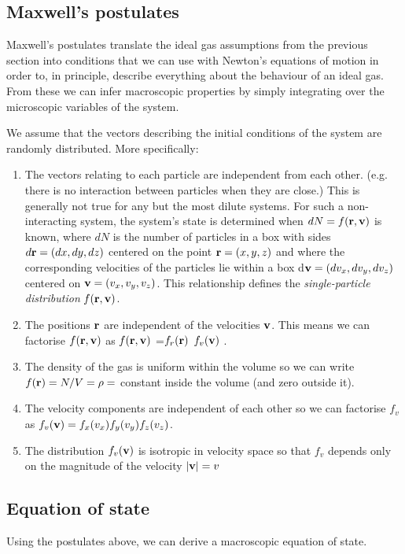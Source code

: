 \subsection{Maxwell's postulates}
Maxwell's postulates translate the ideal gas assumptions from the previous section into conditions that we can use with Newton's equations of motion in order to, in principle, describe everything about the behaviour of an ideal gas. From these we can infer macroscopic properties by simply integrating over the microscopic variables of the system.

We assume that the vectors describing the initial conditions of the system are randomly distributed. More specifically:
\begin{enumerate}
\item The vectors relating to each particle are independent from each other. (e.g. there is no interaction between particles when they are close.) This is generally not true for any but the most dilute systems. For such a non-interacting system, the system's state is determined when $dN=f({\bf r},{\bf v})$ is known, where $dN$ is the number of particles in a box with sides $d{\bf r}=(dx,dy,dz)$ centered on the point ${\bf r} = (x,y,z)$ and where the corresponding velocities of the particles lie within a box d${\bf v}=(dv_x,dv_y,dv_z)$ centered on ${\bf v}=(v_x,v_y,v_z)$. This relationship defines the \emph{single-particle distribution} $f({\bf r},{\bf v})$.
\item The positions ${\bf r}$ are independent of the velocities ${\bf v}$. This means we can factorise $f({\bf r},{\bf v})$ as $f({\bf r},{\bf v})$ =$f_r({\bf r})$ $f_v({\bf v})$ .
\item The density of the gas is uniform within the volume so we can write $f({\bf r}) = N/V=\rho=$ constant inside the volume (and zero outside it).
\item The velocity components are independent of each other so we can factorise $f_v$ as $f_v({\bf v})=f_x(v_x)f_y(v_y)f_z(v_z)$.
\item The distribution $f_v({\bf v})$ is isotropic in velocity space so that $f_v$ depends only on the magnitude of the velocity $|{\bf v}| = v$
\end{enumerate}

\subsection{Equation of state}
Using the postulates above, we can derive a macroscopic equation of state.

